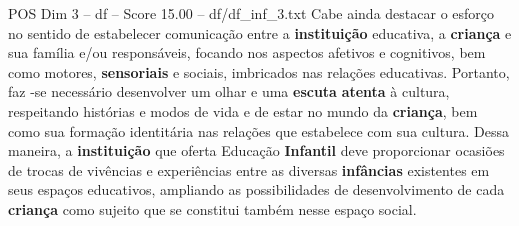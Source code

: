 \begin{textsample}{POS Dim 3 – df – Score 15.00 – df/df\_inf\_3.txt}
Cabe ainda destacar o esforço no sentido de estabelecer comunicação entre a \textbf{instituição} educativa, a \textbf{criança} e sua família e/ou responsáveis, focando nos aspectos afetivos e cognitivos, bem como motores, \textbf{sensoriais} e sociais, imbricados nas relações educativas.
Portanto, faz -se necessário desenvolver um olhar e uma \textbf{escuta} \textbf{atenta} à cultura, respeitando histórias e modos de vida e de estar no mundo da \textbf{criança}, bem como sua formação identitária nas relações que estabelece com sua cultura.
Dessa maneira, a \textbf{instituição} que oferta Educação \textbf{Infantil} deve proporcionar ocasiões de trocas de vivências e experiências entre as diversas \textbf{infâncias} existentes em seus espaços educativos, ampliando as possibilidades de desenvolvimento de cada \textbf{criança} como sujeito que se constitui também nesse espaço social.

\end{textsample}
